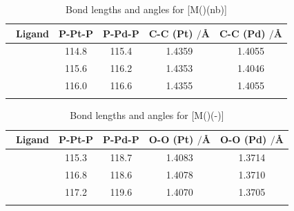 \begin{table}[htbp]
\caption[Bond lengths and angles for [M(\tBuxantphos)(nb){]}]{Bond lengths and angles for [M(\tBuxantphos)(nb){]}}
\vspace{1em}
\label{DFT:nb}
\small
\begin{center}
\begin{tabular}{l c c c c}
	\toprule
	~\bfseries{Ligand} & \bfseries{P-Pt-P\degrees{}} & \bfseries{P-Pd-P\degrees{}} & \bfseries{C-C (Pt)  $/$\si{\angstrom}} & \bfseries{C-C (Pd) $/$\si{\angstrom}}\\
	\midrule		
	~\tBuSixantphos	& 114.8 & 115.4 & 1.4359 & 1.4055 \\
	~\tBuThixantphos	& 115.6 & 116.2 & 1.4353 & 1.4046\\
	~\tBuXantphos{}	& 116.0 & 116.6 & 1.4355 & 1.4055\\
	\bottomrule{}
\end{tabular}
\end{center}
\end{table}

\begin{table}[htbp]
\caption[Bond lengths and angles for \texorpdfstring{M(\tBuxantphos)(\hapto{}-)} M]{Bond lengths and angles for [M(\tBuxantphos)(\hapto{}-){]}}
\vspace{1em}
\label{DFT:O2}
\small
\begin{center}
\begin{tabular}{l c c c c}
	\toprule
	~\bfseries{Ligand} & \bfseries{P-Pt-P\degrees{}} & \bfseries{P-Pd-P\degrees{}} & \bfseries{O-O (Pt) $/$\si{\angstrom}} & \bfseries{O-O (Pd) $/$\si{\angstrom}}\\
	\midrule		
	~\tBuSixantphos	& 115.3 & 118.7 & 1.4083 & 1.3714\\
	~\tBuThixantphos	& 116.8 & 118.6 & 1.4078 & 1.3710\\
	~\tBuXantphos{}	& 117.2 & 119.6 & 1.4070 & 1.3705\\
	\bottomrule{}
\end{tabular}
\end{center}
\end{table}

